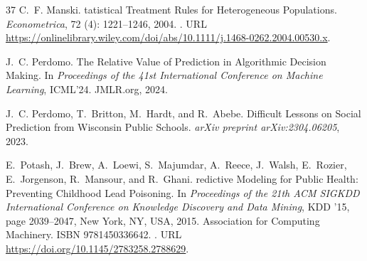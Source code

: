 \documentclass{article} %
\begin{document}
\begin{thebibliography}{37}
C.~F. Manski.
tatistical {T}reatment {R}ules for {H}eterogeneous {P}opulations.
\newblock \emph{Econometrica}, 72 (4): 1221--1246, 2004.
\newblock {}.
\newblock URL \url{https://onlinelibrary.wiley.com/doi/abs/10.1111/j.1468-0262.2004.00530.x}.

J.~C. Perdomo.
\newblock The {{R}}elative {{V}}alue of {{P}}rediction in {{A}}lgorithmic {{D}}ecision {{M}}aking.
\newblock In \emph{Proceedings of the 41st International Conference on Machine Learning}, ICML'24. JMLR.org, 2024.

J.~C. Perdomo, T.~Britton, M.~Hardt, and R.~Abebe.
\newblock Difficult {L}essons on {S}ocial {P}rediction from {W}isconsin {P}ublic {S}chools.
\newblock \emph{arXiv preprint arXiv:2304.06205}, 2023.

E.~Potash, J.~Brew, A.~Loewi, S.~Majumdar, A.~Reece, J.~Walsh, E.~Rozier, E.~Jorgenson, R.~Mansour, and R.~Ghani.
redictive {M}odeling for {P}ublic {H}ealth: {P}reventing {C}hildhood {L}ead {P}oisoning.
\newblock In \emph{Proceedings of the 21th ACM SIGKDD International Conference on Knowledge Discovery and Data Mining}, KDD '15, page 2039–2047, New York, NY, USA, 2015. Association for Computing Machinery.
\newblock ISBN 9781450336642.
\newblock {}.
\newblock URL \url{https://doi.org/10.1145/2783258.2788629}.


\end{thebibliography}
\end{document}
